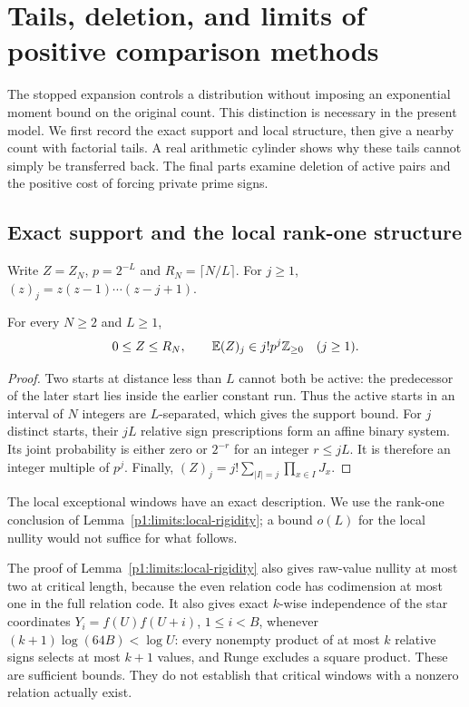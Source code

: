 \section{Tails, deletion, and limits of positive comparison methods}
\label{p1:limits:section}

The stopped expansion controls a distribution without imposing an
exponential moment bound on the original count.  This distinction is
necessary in the present model.  We first record the exact support and
local structure, then give a nearby count with factorial tails.  A real
arithmetic cylinder shows why these tails cannot simply be transferred
back.  The final parts examine deletion of active pairs and the positive
cost of forcing private prime signs.

\subsection{Exact support and the local rank-one structure}

Write $Z=Z_N$, $p=2^{-L}$ and $R_N=\lceil N/L\rceil$.
For $j\ge1$, $(z)_j=z(z-1)\cdots(z-j+1)$.

\begin{proposition}
\label{p1:limits:lattice}
For every $N\ge2$ and $L\ge1$,
\begin{equation}
 0\le Z\le R_N,\qquad
 \mathbb E(Z)_j\in j!p^j\mathbb Z_{\ge0}\quad(j\ge1).
 \label{p1:limits:lattice-eq}
\end{equation}
\end{proposition}
\begin{proof}
Two starts at distance less than $L$ cannot both be active: the
predecessor of the later start lies inside the earlier constant run.
Thus the active starts in an interval of $N$ integers are $L$-separated,
which gives the support bound.  For $j$ distinct starts, their $jL$
relative sign prescriptions form an affine binary system.  Its joint
probability is either zero or $2^{-r}$ for an integer $r\le jL$.
It is therefore an integer multiple of $p^j$.  Finally,
$(Z)_j=j!\sum_{|I|=j}\prod_{x\in I}J_x$.
\end{proof}

The local exceptional windows have an exact description. We use the
rank-one conclusion of Lemma~\ref{p1:limits:local-rigidity}; a bound $o(L)$
for the local nullity would not suffice for what follows.



The proof of Lemma~\ref{p1:limits:local-rigidity} also gives raw-value nullity at most two at critical length,
because the even relation code has codimension at most one in the
full relation code.  It also gives exact $k$-wise independence of the star coordinates
$Y_i=f(U)f(U+i)$, $1\le i<B$, whenever
$(k+1)\log(64B)<\log U$: every nonempty product of at most $k$
relative signs selects at most $k+1$ values, and Runge excludes a
square product.  These are sufficient bounds.  They do not establish
that critical windows with a nonzero relation actually exist.

